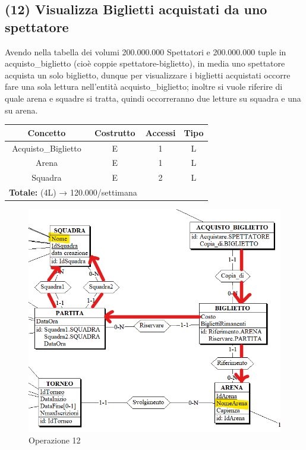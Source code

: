 \documentclass[a4paper,12pt]{report}
\begin{document}
\subsection*{(12)  Visualizza Biglietti acquistati da uno spettatore}
Avendo nella tabella dei volumi 200.000.000 Spettatori e 200.000.000 tuple in acquisto\_biglietto (cioè coppie spettatore-biglietto), in media uno spettatore acquista un solo biglietto, dunque per visualizzare i biglietti acquistati occorre fare una sola lettura nell'entità acquisto\_biglietto; inoltre si vuole riferire di quale arena e squadre si tratta, quindi occorreranno due letture su squadra e una su arena.
\begin{center}
	\begin{tabular}{|c|c|c|c|}
		\hline\rowcolor{pink}
		Concetto & Costrutto & Accessi & Tipo\\
		\hline\hline		
		Acquisto\_Biglietto & E & 1 & L\\
		\hline
		Arena & E & 1 & L\\
		\hline
		Squadra & E & 2 & L\\
		\hline
		\multicolumn{2}{l}{%
			\textbf{Totale:} (4L) → 120.000/settimana} \\
		\hline
	\end{tabular}
\end{center}
\begin{figure}[!htb]
	\centerline{\includegraphics[scale=0.8]{img/op12.png}}
	\caption{Operazione 12}
\end{figure}
\end{document}
